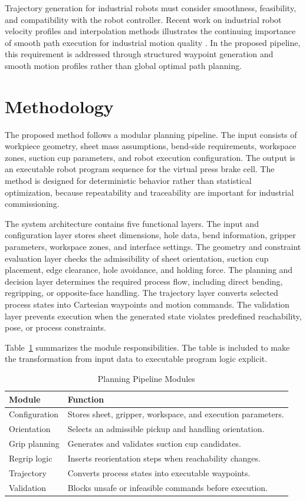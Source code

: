 \documentclass[journal]{IEEEtran}
\begin{document}
Trajectory generation for industrial robots must consider smoothness, feasibility, and compatibility with the robot controller. Recent work on industrial robot velocity profiles and interpolation methods illustrates the continuing importance of smooth path execution for industrial motion quality \cite{Wang2022SVelocity}. In the proposed pipeline, this requirement is addressed through structured waypoint generation and smooth motion profiles rather than global optimal path planning.

\section{Methodology}
The proposed method follows a modular planning pipeline. The input consists of workpiece geometry, sheet mass assumptions, bend-side requirements, workspace zones, suction cup parameters, and robot execution configuration. The output is an executable robot program sequence for the virtual press brake cell. The method is designed for deterministic behavior rather than statistical optimization, because repeatability and traceability are important for industrial commissioning.

The system architecture contains five functional layers. The input and configuration layer stores sheet dimensions, hole data, bend information, gripper parameters, workspace zones, and interface settings. The geometry and constraint evaluation layer checks the admissibility of sheet orientation, suction cup placement, edge clearance, hole avoidance, and holding force. The planning and decision layer determines the required process flow, including direct bending, regripping, or opposite-face handling. The trajectory layer converts selected process states into Cartesian waypoints and motion commands. The validation layer prevents execution when the generated state violates predefined reachability, pose, or process constraints.

Table~\ref{tab:pipeline_modules} summarizes the module responsibilities. The table is included to make the transformation from input data to executable program logic explicit.

\begin{table}[htbp]
\caption{Planning Pipeline Modules}
\label{tab:pipeline_modules}
\centering
\begin{tabular}{p{}p{}}
\toprule
\textbf{Module} & \textbf{Function} \\
\midrule
Configuration & Stores sheet, gripper, workspace, and execution parameters. \\
Orientation & Selects an admissible pickup and handling orientation. \\
Grip planning & Generates and validates suction cup candidates. \\
Regrip logic & Inserts reorientation steps when reachability changes. \\
Trajectory & Converts process states into executable waypoints. \\
Validation & Blocks unsafe or infeasible commands before execution. \\
\bottomrule
\end{tabular}
\end{table}
\end{document}
